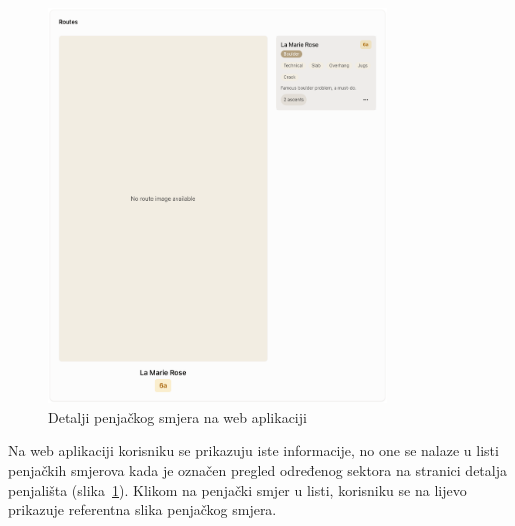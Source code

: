 \begin{figure}[H]
    \centering
    \includegraphics[width=0.8\textwidth]{images/implementacija/web/route-details/route-details.png}
    \caption{Detalji penjačkog smjera na web aplikaciji}
    \label{fig:detalji_smjera_web}
\end{figure}

Na web aplikaciji korisniku se prikazuju iste informacije, no one se nalaze u listi penjačkih smjerova kada je označen pregled određenog sektora na stranici detalja penjališta (slika~\ref{fig:detalji_smjera_web}). Klikom na penjački smjer u listi, korisniku se na lijevo prikazuje referentna slika penjačkog smjera.

